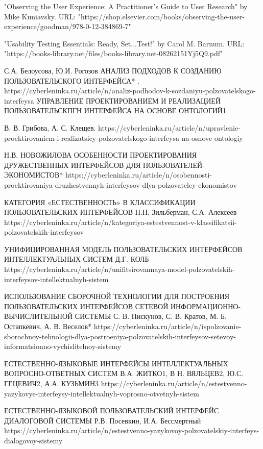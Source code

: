 \documentclass{article}
\begin{document}
"Observing the User Experience: A Practitioner's Guide to User Research" by Mike Kuniavsky. URL: "https://shop.elsevier.com/books/observing-the-user-experience/goodman/978-0-12-384869-7"

"Usability Testing Essentials: Ready, Set...Test!" by Carol M. Barnum. URL: "https://books-library.net/files/books-library.net-08262151Yj5Q9.pdf"


С.А. Белоусова, Ю.И. Рогозов
АНАЛИЗ ПОДХОДОВ К СОЗДАНИЮ ПОЛЬЗОВАТЕЛЬСКОГО
ИНТЕРФЕЙСА* . https://cyberleninka.ru/article/n/analiz-podhodov-k-sozdaniyu-polzovatelskogo-interfeysa
УПРАВЛЕНИЕ ПРОЕКТИРОВАНИЕМ И РЕАЛИЗАЦИЕЙ ПОЛЬЗОВАТЕЛЬСКПГН ИНТЕРФЕЙСА НА ОСНОВЕ ОНТОЛОГИЙ1

В. В. Грибова, А. С. Клещев. https://cyberleninka.ru/article/n/upravlenie-proektirovaniem-i-realizatsiey-polzovatelskogo-interfeysa-na-osnove-ontologiy

 Н.В. НОВОЖИЛОВА
ОСОБЕННОСТИ ПРОЕКТИРОВАНИЯ ДРУЖЕСТВЕННЫХ ИНТЕРФЕЙСОВ ДЛЯ ПОЛЬЗОВАТЕЛЕЙ-ЭКОНОМИСТОВ*
https://cyberleninka.ru/article/n/osobennosti-proektirovaniya-druzhestvennyh-interfeysov-dlya-polzovateley-ekonomistov

КАТЕГОРИЯ «ЕСТЕСТВЕННОСТЬ» В КЛАССИФИКАЦИИ ПОЛЬЗОВАТЕЛЬСКИХ ИНТЕРФЕЙСОВ
Н.Н. Зильберман, С.А. Алексеев
https://cyberleninka.ru/article/n/kategoriya-estestvennost-v-klassifikatsii-polzovatelskih-interfeysov

УНИФИЦИРОВАННАЯ МОДЕЛЬ ПОЛЬЗОВАТЕЛЬСКИХ ИНТЕРФЕЙСОВ
ИНТЕЛЛЕКТУАЛЬНЫХ СИСТЕМ
Д.Г. КОЛБ
https://cyberleninka.ru/article/n/unifitsirovannaya-model-polzovatelskih-interfeysov-intellektualnyh-sistem

ИСПОЛЬЗОВАНИЕ СБОРОЧНОЙ ТЕХНОЛОГИИ ДЛЯ ПОСТРОЕНИЯ ПОЛЬЗОВАТЕЛЬСКИХ ИНТЕРФЕЙСОВ СЕТЕВОЙ ИНФОРМАЦИОННО-ВЫЧИСЛИТЕЛЬНОЙ
СИСТЕМЫ
С. В. Пискунов, С. В. Кратов, М. Б. Остапкевич, А. В. Веселов*
https://cyberleninka.ru/article/n/ispolzovanie-sborochnoy-tehnologii-dlya-postroeniya-polzovatelskih-interfeysov-setevoy-informatsionno-vychislitelnoy-sistemy

 ЕСТЕСТВЕННО-ЯЗЫКОВЫЕ ИНТЕРФЕЙСЫ ИНТЕЛЛЕКТУАЛЬНЫХ ВОПРОСНО-ОТВЕТНЫХ СИСТЕМ
В.А. ЖИТКО1, В Н. ВЯЛЬЦЕВ2, Ю.С. ГЕЦЕВИЧ2, А.А. КУЗЬМИН3
https://cyberleninka.ru/article/n/estestvenno-yazykovye-interfeysy-intellektualnyh-voprosno-otvetnyh-sistem

ЕСТЕСТВЕННО-ЯЗЫКОВОЙ ПОЛЬЗОВАТЕЛЬСКИЙ ИНТЕРФЕЙС
ДИАЛОГОВОЙ СИСТЕМЫ
Р.В. Посевкин, И.А. Бессмертный https://cyberleninka.ru/article/n/estestvenno-yazykovoy-polzovatelskiy-interfeys-dialogovoy-sistemy
\end{document}
